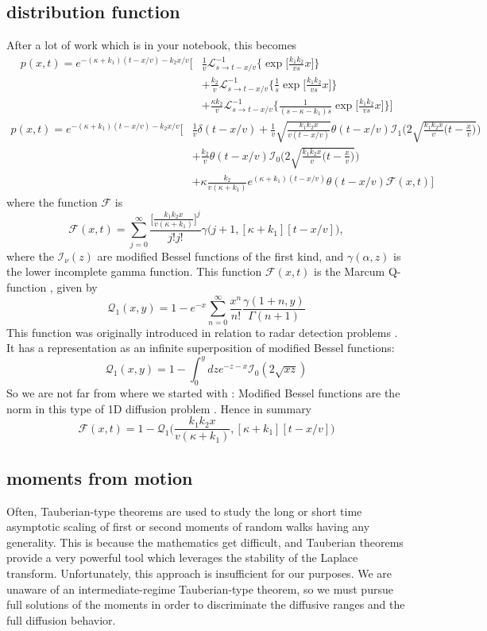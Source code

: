 \documentclass[]{agujournal2018}
\newcommand\be{\begin{equation}}
\newcommand\ee{\end{equation}}
\newcommand\El{\mathcal{L}}
\begin{document}
\subsection{distribution function}
After a lot of work which is in your notebook, this becomes
\begin{align}
p(x,t) = e^{-(\kappa + k_1)(t-x/v)-k_2x/v}
\Big[&\frac{1}{v}\El_{s\rightarrow t-x/v}^{-1}\Big\{\exp\Big[\frac{k_1k_2}{vs}x\Big]\Big\} \\
&+ \frac{k_2}{v}\El_{s\rightarrow t-x/v}^{-1}\Big\{\frac{1}{s}\exp\Big[\frac{k_1k_2}{vs}x\Big]\Big\} \\
&+ \frac{\kappa k_2}{v}\El_{s\rightarrow t-x/v}^{-1}\Big\{\frac{1}{(s-\kappa-k_1)s}\exp\Big[\frac{k_1k_2}{vs}x\Big]\Big\}\Big]
\end{align}
\begin{align}
p(x,t) = e^{-(\kappa + k_1)(t-x/v)-k_2x/v}
\Bigg[&\frac{1}{v}\delta(t-x/v) + \frac{1}{v}\sqrt{\frac{k_1k_2x}{v(t-x/v)}}\theta(t-x/v)\mathcal{I}_1\Bigg(2\sqrt{\frac{k_1k_2x}{v}\Big(t-\frac{x}{v}\Big)}\Bigg)\\
&+\frac{k_2}{v}\theta(t-x/v)\mathcal{I}_0\Bigg(2\sqrt{\frac{k_1k_2x}{v}\Big(t-\frac{x}{v}\Big)}\Bigg)\\
&+ \kappa\frac{ k_2}{v(\kappa+k_1)}e^{(\kappa+k_1)(t-x/v)}\theta(t-x/v)\mathcal{F}(x,t)\Bigg]
\end{align}
where the function $\mathcal{F}$ is
\be \mathcal{F}(x,t) = \sum_{j=0}^\infty \frac{\big[\frac{k_1k_2x}{v(\kappa+k_1)}\big]^j}{j!j!} \gamma\big(j+1,[\kappa+k_1][t-x/v]\big),\ee
where the $\mathcal{I}_\nu(z)$ are modified Bessel functions of the first kind, and $\gamma(\alpha,z)$ is the lower incomplete gamma function.
This function $\mathcal{F}(x,t)$ is the Marcum Q-function \citep{Temme1996}, given by 
\be \mathcal{Q}_1(x,y) = 1-e^{-x}\sum_{n=0}^\infty \frac{x^n}{n!}\frac{\gamma(1+n,y)}{\Gamma(n+1)}\ee
This function was originally introduced in relation to radar detection problems \citep[e.g.][]{Marcum1960}. It has a representation as an infinite superposition of modified Bessel functions:
\be \mathcal{Q}_1(x,y) = 1- \int_0^ydz e^{-z-x}\mathcal{I}_0(2\sqrt{xz})\ee
So we are not far from where we started with \citet{Lisle1998}: Modified Bessel functions are the norm in this type of 1D diffusion problem \citep[e.g.][]{Lisle1998}.
Hence in summary \be \mathcal{F}(x,t) = 1-\mathcal{Q}_1\Big(\frac{k_1k_2x}{v(\kappa+k_1)},[\kappa+k_1][t-x/v] \Big)\ee
\subsection{moments from motion}
Often, Tauberian-type theorems are used to study the long or short time asymptotic scaling of first or second moments of random walks having any generality.
This is because the mathematics get difficult, and Tauberian theorems provide a very powerful tool which leverages the stability of the Laplace transform.
Unfortunately, this approach is insufficient for our purposes. We are unaware of an intermediate-regime Tauberian-type theorem, so we must pursue full solutions of the moments in order to discriminate the diffusive ranges and the full diffusion behavior.
\end{document}
